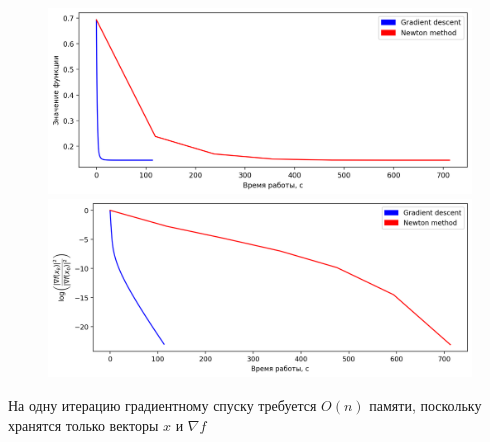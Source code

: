 \documentclass[notitlepage]{article}
\begin{document}
\begin{figure}[ht]
\begin{minipage}[t]{.5\textwidth}
  \centering
  \includegraphics[width=\textwidth, keepaspectratio]{plots/real-sim.bz2_plot_func.png}
\end{minipage}
\begin{minipage}[t]{.5\textwidth}
  \centering
  \includegraphics[width=\textwidth, keepaspectratio]{plots/real-sim.bz2_plot_grad.png}
\end{minipage}
\end{figure}

На одну итерацию градиентному спуску требуется $O(n)$ памяти, поскольку хранятся только векторы $x$ и $\nabla f$
			
			
\end{document}
